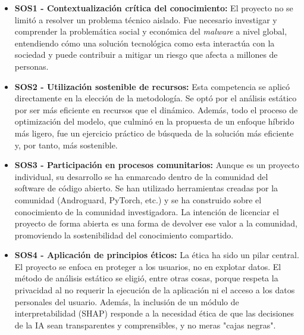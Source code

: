 \begin{itemize}
	\item \textbf{SOS1 - Contextualización crítica del conocimiento:} El proyecto no se limitó a resolver un problema técnico aislado. Fue necesario investigar y comprender la problemática social y económica del \textit{malware} a nivel global, entendiendo cómo una solución tecnológica como esta interactúa con la sociedad y puede contribuir a mitigar un riesgo que afecta a millones de personas.
	
	\item \textbf{SOS2 - Utilización sostenible de recursos:} Esta competencia se aplicó directamente en la elección de la metodología. Se optó por el análisis estático por ser más eficiente en recursos que el dinámico. Además, todo el proceso de optimización del modelo, que culminó en la propuesta de un enfoque híbrido más ligero, fue un ejercicio práctico de búsqueda de la solución más eficiente y, por tanto, más sostenible.
	
	\item \textbf{SOS3 - Participación en procesos comunitarios:} Aunque es un proyecto individual, su desarrollo se ha enmarcado dentro de la comunidad del software de código abierto. Se han utilizado herramientas creadas por la comunidad (Androguard, PyTorch, etc.) y se ha construido sobre el conocimiento de la comunidad investigadora. La intención de licenciar el proyecto de forma abierta es una forma de devolver ese valor a la comunidad, promoviendo la sostenibilidad del conocimiento compartido.
	
	\item \textbf{SOS4 - Aplicación de principios éticos:} La ética ha sido un pilar central. El proyecto se enfoca en proteger a los usuarios, no en explotar datos. El método de análisis estático se eligió, entre otras cosas, porque respeta la privacidad al no requerir la ejecución de la aplicación ni el acceso a los datos personales del usuario. Además, la inclusión de un módulo de interpretabilidad (SHAP) responde a la necesidad ética de que las decisiones de la IA sean transparentes y comprensibles, y no meras "cajas negras".
\end{itemize}